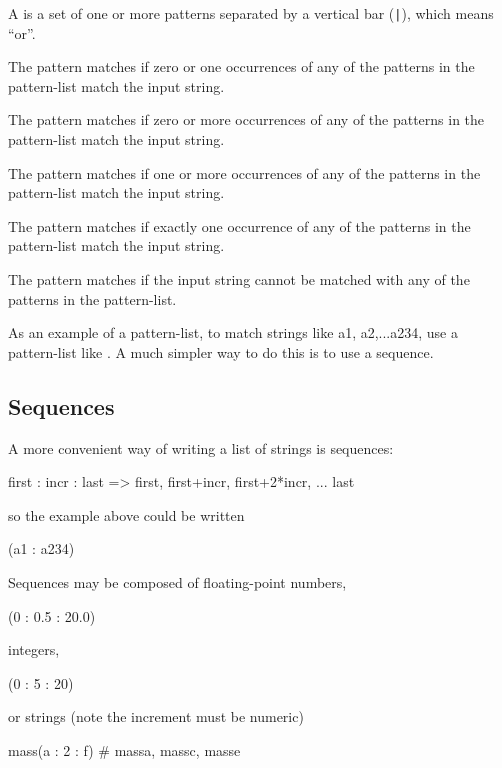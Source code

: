 A  is a set of one or more patterns separated by
a vertical bar (\verb+|+), which means ``or''.
	\begin{description}
       \item{}
              The pattern matches if zero or one occurrences of any of  the
              patterns in the pattern-list match the input string.

       \item{}
              The  pattern matches if zero or more occurrences of any of the
              patterns in the pattern-list match the input string.

       \item{}
              The pattern matches if one or more occurrences of any of  the
              patterns in the pattern-list match the input string.

       \item{}
              The  pattern  matches  if exactly one occurrence of any of the
              patterns in the pattern-list match the input string.

       \item{}
              The pattern matches if the input string cannot be matched with any
              of the patterns in the pattern-list.
	\end{description}
As an example of a pattern-list, to match strings like a1, a2,...a234,
use a pattern-list like .
A much simpler way to do this is to use a \Matlab sequence.

\subsection{Sequences}\label{sect:sequences}
A more convenient way of writing a list of strings is \Matlab sequences:
\begin{example}
first : incr : last => first, first+incr, first+2*incr, ... last
\end{example}
so the example above could be written
\begin{example}
(a1 : a234)
\end{example}
Sequences may be composed of floating-point numbers,
\begin{example}
(0 : 0.5 : 20.0)
\end{example}
integers,
\begin{example}
(0 : 5 : 20)
\end{example}
or strings (note the increment must be numeric)
\begin{example}
mass(a : 2 : f)   # massa, massc, masse
\end{example}

